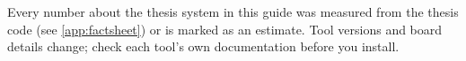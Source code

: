 \begin{titlepage}
\vfill
{\sffamily\small\color{conceptc}
Every number about the thesis system in this guide was measured from the thesis code (see \cref{app:factsheet}) or is marked as an estimate. Tool versions and board details change; check each tool's own documentation before you install.\par}
\end{titlepage}
